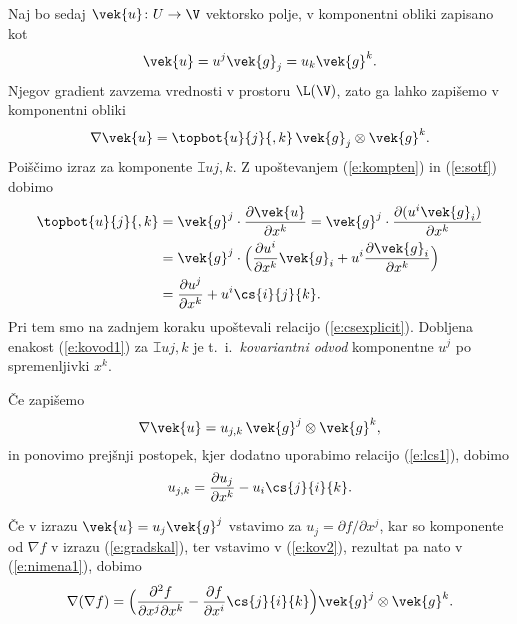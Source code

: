 Naj bo sedaj $\vek{u}\colon U\to\V$ vektorsko polje, v komponentni obliki
zapisano kot
\[ \vek{u}=u^j\vek{g}_j=u_k\vek{g}^k. \]
Njegov gradient zavzema vrednosti v prostoru $\L(\V)$, zato ga lahko zapišemo v komponentni obliki
\begin{equation} \label{e:gradukomp}
	\nabla\vek{u}=\topbot{u}{j}{,k}\,\vek{g}_j\otimes\vek{g}^k.
\end{equation}
Poiščimo izraz za komponente $\topbot{u}{j}{,k}$. Z upoštevanjem
(\ref{e:kompten}) in (\ref{e:sotf}) dobimo
\begin{align}
	\topbot{u}{j}{,k}&=\vek{g}^j\cdot\frac{\partial\vek{u}}{\partial x^k}=
	\vek{g}^j\cdot\frac{\partial(u^i\vek{g}_i)}{\partial x^k} \nonumber \\
	&=\vek{g}^j\cdot\Big(\frac{\partial u^i}{\partial x^k}\vek{g}_i+
	u^i\frac{\partial\vek{g}_i}{\partial x^k}\Big) \nonumber \\
	&=\frac{\partial u^j}{\partial x^k}+u^i\cs{i}{j}{k}. \label{e:kovod1}
\end{align}
Pri tem smo na zadnjem koraku upoštevali relacijo (\ref{e:csexplicit}). Dobljena enakost (\ref{e:kovod1})
za $\topbot{u}{j}{,k}$ je t.~i.~\emph{kovariantni odvod} komponentne $u^j$ po spremenljivki $x^k$.

Če zapišemo
\begin{equation} \label{e:nimena1}
	\nabla\vek{u}=u_{j,k}\,\vek{g}^j\otimes\vek{g}^k,
\end{equation}
in ponovimo prejšnji postopek, kjer dodatno uporabimo relacijo (\ref{e:lcs1}), dobimo
\begin{equation} \label{e:kov2}
	u_{j,k}=\frac{\partial u_j}{\partial x^k}-u_i\cs{j}{i}{k}.
\end{equation}
\begin{primer}
	Če v izrazu $\vek{u}=u_j\vek{g}^j$ vstavimo za $u_j=\partial f/\partial x^j$,
	kar so komponente od $\nabla f$ v izrazu (\ref{e:gradskal}), ter vstavimo v
	(\ref{e:kov2}), rezultat pa nato v (\ref{e:nimena1}), dobimo
	\begin{equation} \label{e:dvagrad}
		\nabla(\nabla f)=\Big(\frac{\partial^2 f}{\partial x^j\partial x^k}-
		\frac{\partial f}{\partial x^i}\cs{j}{i}{k}\Big)\vek{g}^j\otimes\vek{g}^k.
	\end{equation}
\end{primer}

